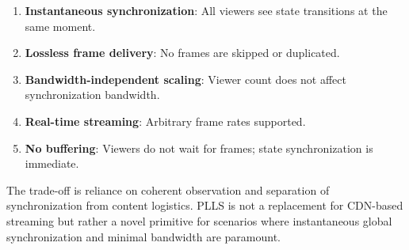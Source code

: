 \documentclass[twocolumn,10pt,a4paper]{article}
\theoremstyle{plain}
\theoremstyle{definition}
\begin{document}
\begin{enumerate}
\item \textbf{Instantaneous synchronization}: All viewers see state transitions at the same moment.
\item \textbf{Lossless frame delivery}: No frames are skipped or duplicated.
\item \textbf{Bandwidth-independent scaling}: Viewer count does not affect synchronization bandwidth.
\item \textbf{Real-time streaming}: Arbitrary frame rates supported.
\item \textbf{No buffering}: Viewers do not wait for frames; state synchronization is immediate.
\end{enumerate}

The trade-off is reliance on coherent observation and separation of synchronization from content logistics. PLLS is not a replacement for CDN-based streaming but rather a novel primitive for scenarios where instantaneous global synchronization and minimal bandwidth are paramount.



\end{document}

